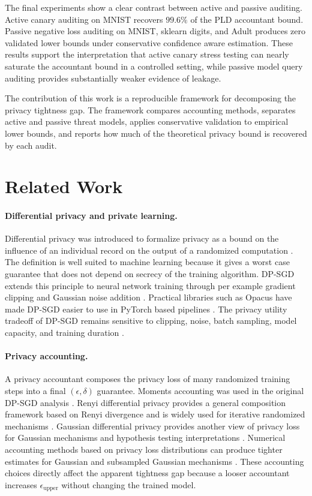 \documentclass{article}
\begin{document}
The final experiments show a clear contrast between active and passive auditing. Active canary auditing on MNIST recovers $99.6\%$ of the PLD accountant bound. Passive negative loss auditing on MNIST, sklearn digits, and Adult produces zero validated lower bounds under conservative confidence aware estimation. These results support the interpretation that active canary stress testing can nearly saturate the accountant bound in a controlled setting, while passive model query auditing provides substantially weaker evidence of leakage.

The contribution of this work is a reproducible framework for decomposing the privacy tightness gap. The framework compares accounting methods, separates active and passive threat models, applies conservative validation to empirical lower bounds, and reports how much of the theoretical privacy bound is recovered by each audit.

\section{Related Work}
\paragraph{Differential privacy and private learning.}
Differential privacy was introduced to formalize privacy as a bound on the influence of an individual record on the output of a randomized computation \citep{dwork2006calibrating,dwork2014algorithmic}. The definition is well suited to machine learning because it gives a worst case guarantee that does not depend on secrecy of the training algorithm. DP-SGD extends this principle to neural network training through per example gradient clipping and Gaussian noise addition \citep{abadi2016deep}. Practical libraries such as Opacus have made DP-SGD easier to use in PyTorch based pipelines \citep{yousefpour2021opacus}. The privacy utility tradeoff of DP-SGD remains sensitive to clipping, noise, batch sampling, model capacity, and training duration \citep{jayaraman2019evaluating,tramer2022debugging}.

\paragraph{Privacy accounting.}
A privacy accountant composes the privacy loss of many randomized training steps into a final $(\epsilon,\delta)$ guarantee. Moments accounting was used in the original DP-SGD analysis \citep{abadi2016deep}. Renyi differential privacy provides a general composition framework based on Renyi divergence and is widely used for iterative randomized mechanisms \citep{mironov2017renyi}. Gaussian differential privacy provides another view of privacy loss for Gaussian mechanisms and hypothesis testing interpretations \citep{dong2019gaussian}. Numerical accounting methods based on privacy loss distributions can produce tighter estimates for Gaussian and subsampled Gaussian mechanisms \citep{koskela2020computing,gopi2021numerical}. These accounting choices directly affect the apparent tightness gap because a looser accountant increases $\epsilon_{\mathrm{upper}}$ without changing the trained model.
\end{document}

